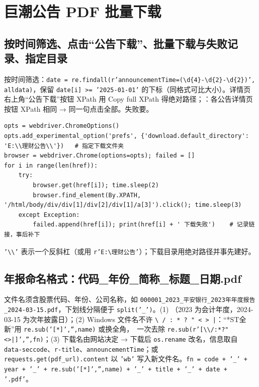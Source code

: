 \section{巨潮公告 PDF 批量下载}

\subsection{按时间筛选、点击“公告下载”、批量下载与失败记录、指定目录}
按时间筛选：\texttt{date = re.findall(r'announcementTime=(\textbackslash d\{4\}-\textbackslash d\{2\}-\textbackslash d\{2\})', alldata)}，保留 \texttt{date[i] >= '2025-01-01'} 的下标（同格式可比大小）。详情页右上角“公告下载”按钮 XPath 用 Copy full XPath 得绝对路径；：各公告详情页按钮 XPath 相同 → 同一句点击全部。失败要。
\begin{lstlisting}[style=pyD07]
opts = webdriver.ChromeOptions()
opts.add_experimental_option('prefs', {'download.default_directory': 'E:\\理财公告\\'})   # 指定下载文件夹
browser = webdriver.Chrome(options=opts); failed = []
for i in range(len(href)):
    try:
        browser.get(href[i]); time.sleep(2)
        browser.find_element(By.XPATH, '/html/body/div/div[1]/div[2]/div[1]/a[3]').click(); time.sleep(3)
    except Exception:
        failed.append(href[i]); print(href[i] + ' 下载失败')    # 记录链接，事后补下
\end{lstlisting}
\texttt{'\textbackslash\textbackslash'} 表示一个反斜杠（或用 \texttt{r'E:\textbackslash 理财公告'}）；下载目录用绝对路径并事先建好。

\subsection{年报命名格式：代码\_年份\_简称\_标题\_日期.pdf}
文件名须含股票代码、年份、公司名称，如 \texttt{000001\_2023\_平安银行\_2023年年度报告\_2024-03-15.pdf}，下划线分隔便于 \texttt{split('\_')}。(1) （2023 为会计年度，2024-03-15 为次年披露日）；(2) Windows 文件名不许 \texttt{\textbackslash{} / : * ? " < > |}：“*ST全新”用 \texttt{re.sub('[*]','',name)} 或换全角，\tagext\ 一次去除 \texttt{re.sub(r'[\textbackslash\textbackslash/:*?"<>|]','',fn)}；(3) 下载名由网站决定 → 下载后 \texttt{os.rename} 改名，信息取自 \texttt{data-seccode}、\texttt{r-title}、\texttt{announcementTime}；或 \texttt{requests.get(pdf\_url).content} 以 \texttt{'wb'} 写入新文件名。\texttt{fn = code + '\_' + year + '\_' + re.sub('[*]','',name) + '\_' + title + '\_' + date + '.pdf'}。

